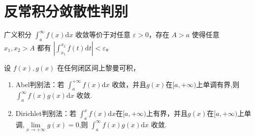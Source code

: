 \documentclass[../../main.tex]{subfiles}
\begin{document}
\section{反常积分敛散性判别}

\begin{theorem}[Cauchy收敛准则]
广义积分 \(\int_{a}^{\infty} f(x) \mathrm{d}x\) 收敛等价于对任意 \(\varepsilon > 0\)，存在 \(A > a\) 使得任意 \(x_1,x_2 > A\) 都有 \(\left|\int_{x_1}^{x_2} f(t) \mathrm{d}t\right| < \varepsilon\)。 
\end{theorem}

\begin{theorem}[A-D判别法]
设 \(f(x),g(x)\) 在任何闭区间上黎曼可积，
\begin{enumerate}
\item {\heiti Abel判别法}：若 \(\int_{a}^{+\infty} f(x) \mathrm{d}x\) 收敛，并且$g(x)$在$[a,+\infty)$上单调有界,则 \(\int_{a}^{\infty} f(x)g(x) \mathrm{d}x\) 收敛.

\item {\heiti Dirichlet判别法}：若 \(\int_{a}^{x} f(x) \mathrm{d}x\)在$[a,+\infty)$上有界，并且\(g(x)\)在\([a,+\infty)\)上单调,$\underset{x\rightarrow +\infty}{\lim}g\left( x \right) =0$,则 \(\int_{a}^{\infty} f(x)g(x) \mathrm{d}x\) 收敛.
\end{enumerate}
\end{theorem}
\end{document}
